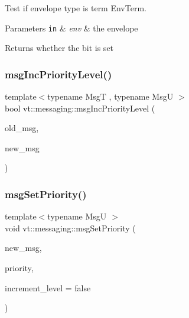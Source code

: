 Test if envelope type is term {\ttfamily Env\+Term}. 


\begin{DoxyParams}[1]{Parameters}
\mbox{\tt in}  & {\em env} & the envelope\\
\hline
\end{DoxyParams}
\begin{DoxyReturn}{Returns}
whether the bit is set 
\end{DoxyReturn}
\mbox{\label{namespacevt_1_1messaging_a6ee5ed1aac4e553185dc3fe80544ac2a}} 
\subsubsection{\texorpdfstring{msg\+Inc\+Priority\+Level()}{msgIncPriorityLevel()}}
{\footnotesize\ttfamily template$<$typename MsgT , typename MsgU $>$ \\
bool vt\+::messaging\+::msg\+Inc\+Priority\+Level (\begin{DoxyParamCaption}\item[{MsgT}]{old\+\_\+msg,  }\item[{MsgU}]{new\+\_\+msg }\end{DoxyParamCaption})}

\mbox{\label{namespacevt_1_1messaging_ab8115ae64f9c390e7a92f3f02aea8454}} 
\subsubsection{\texorpdfstring{msg\+Set\+Priority()}{msgSetPriority()}}
{\footnotesize\ttfamily template$<$typename MsgU $>$ \\
void vt\+::messaging\+::msg\+Set\+Priority (\begin{DoxyParamCaption}\item[{MsgU}]{new\+\_\+msg,  }\item[{\hyperlink{namespacevt_a86bff9f556eb761b27fc8600d006ac04}{Priority\+Type}}]{priority,  }\item[{bool}]{increment\+\_\+level = {\ttfamily false} }\end{DoxyParamCaption})}

